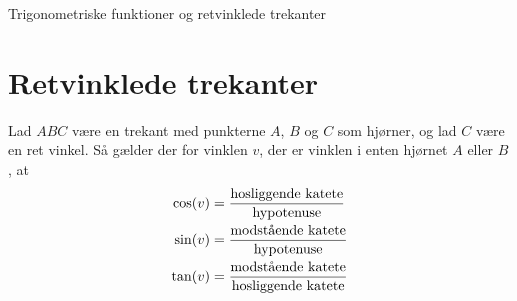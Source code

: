 
\begin{center}
\Huge
Trigonometriske funktioner og retvinklede trekanter
\end{center}
\section*{Retvinklede trekanter}

\begin{setn}
Lad $ABC$ være en trekant med punkterne $A$,  $B$ og $C$ som hjørner, og lad $C$ være en ret vinkel. Så gælder der for vinklen $v$, der er vinklen i enten hjørnet $A$ eller $B$, at 
\begin{align*}
\cos(v) &= \frac{\textnormal{hosliggende katete}}{\textnormal{hypotenuse}}\\
\sin(v) &= \frac{\textnormal{modstående katete}}{\textnormal{hypotenuse}}\\
\tan(v) &= \frac{\textnormal{modstående katete}}{\textnormal{hosliggende katete}}
\end{align*}
\end{setn}
